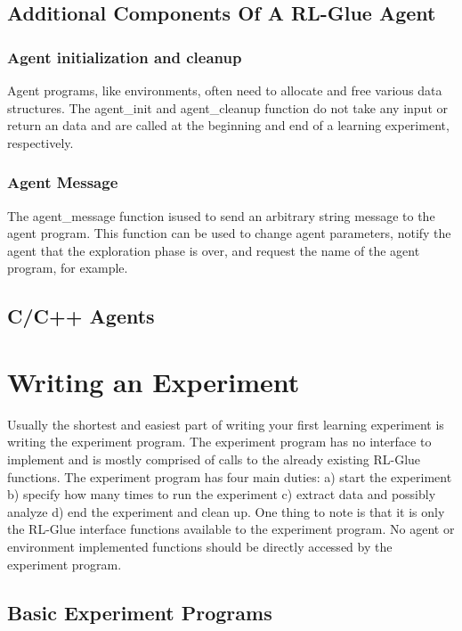 \documentclass[11pt]{article}
\begin{document}
\subsection{Additional Components Of A RL-Glue Agent}
\label{agentp2}

\subsubsection{Agent initialization and cleanup}
Agent programs, like environments, often need to allocate and free various data structures. The agent\_init and agent\_cleanup function do not take any input or return an data and are called at the beginning and end of a learning experiment, respectively.  

\subsubsection{Agent Message}
The agent\_message function isused to send an arbitrary string message to the agent program. This function can be used to change agent parameters, notify the agent that the exploration phase is over, and request the name of the agent program, for example.

\subsection{C/C++ Agents}
\label{agentp3}



\section{Writing an Experiment}
\label{exp}
Usually the shortest and easiest part of writing your first learning experiment is writing the experiment program. The experiment program has no interface to implement and is mostly comprised of calls to the already existing RL-Glue functions. The experiment program has four main duties: a) start the experiment b) specify how many times to run the experiment c) extract data and possibly analyze d) end the experiment and clean up.  One thing to note is that it is only the RL-Glue interface functions available to the experiment program. No agent or environment implemented functions should be directly accessed by the experiment program.

\subsection{Basic Experiment Programs}
\label{expp1}
\end{document}
